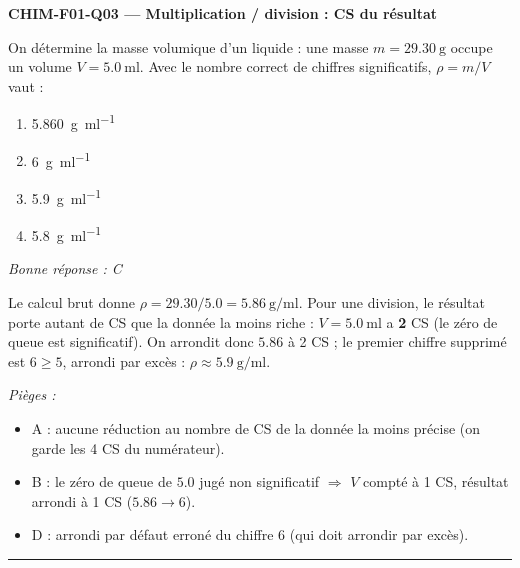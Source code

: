 \documentclass[11pt,a4paper]{article}
\begin{document}
\noindent\textbf{CHIM-F01-Q03 --- Multiplication / division : CS du résultat}\par
On détermine la masse volumique d'un liquide : une masse $m = \qty{29.30}{\gram}$ occupe un volume $V = \qty{5.0}{\milli\litre}$. Avec le nombre correct de chiffres significatifs, $\rho = m/V$ vaut :
\begin{enumerate}[label=\Alph*)]
\item \qty{5.860}{\gram\per\milli\litre}
\item \qty{6}{\gram\per\milli\litre}
\item \qty{5.9}{\gram\per\milli\litre}
\item \qty{5.8}{\gram\per\milli\litre}
\end{enumerate}
\textit{Bonne réponse : C}\par
Le calcul brut donne $\rho = \num{29.30}/\num{5.0} = \num{5.86}\ \si{\gram\per\milli\litre}$. Pour une division, le résultat porte autant de CS que la donnée la moins riche : $V = \qty{5.0}{\milli\litre}$ a \textbf{2} CS (le zéro de queue est significatif). On arrondit donc $\num{5.86}$ à 2 CS ; le premier chiffre supprimé est $6 \ge 5$, arrondi par excès : $\rho \approx \qty{5.9}{\gram\per\milli\litre}$.\par
\textit{Pièges :}
\begin{itemize}
\item A : aucune réduction au nombre de CS de la donnée la moins précise (on garde les 4 CS du numérateur).
\item B : le zéro de queue de $\num{5.0}$ jugé non significatif $\Rightarrow$ $V$ compté à 1 CS, résultat arrondi à 1 CS ($\num{5.86} \to 6$).
\item D : arrondi par défaut erroné du chiffre $6$ (qui doit arrondir par excès).
\end{itemize}
\vspace{6pt}\hrule\vspace{8pt}
\end{document}
